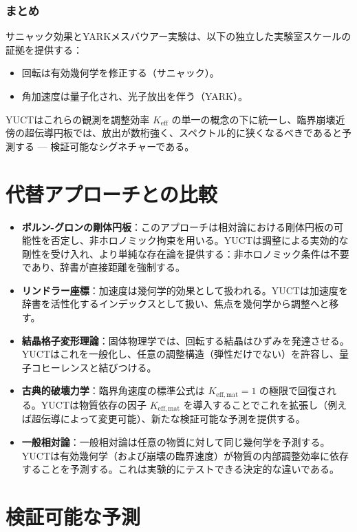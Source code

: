 \documentclass[12pt,a4paper]{article}
\begin{document}
	\subsubsection{まとめ}
	
	サニャック効果とYARKメスバウアー実験は、以下の独立した実験室スケールの証拠を提供する：
	\begin{itemize}
		\item 回転は有効幾何学を修正する（サニャック）。
		\item 角加速度は量子化され、光子放出を伴う（YARK）。
	\end{itemize}
	YUCTはこれらの観測を調整効率 \(K_{\mathrm{eff}}\) の単一の概念の下に統一し、臨界崩壊近傍の超伝導円板では、放出が数桁強く、スペクトル的に狭くなるべきであると予測する — 検証可能なシグネチャーである。
	
	\section{代替アプローチとの比較}
	\label{sec:comparison}
	
	\begin{itemize}
		\item \textbf{ボルン-グロンの剛体円板}：このアプローチは相対論における剛体円板の可能性を否定し、非ホロノミック拘束を用いる。YUCTは調整による実効的な剛性を受け入れ、より単純な存在論を提供する：非ホロノミック条件は不要であり、辞書が直接距離を強制する。
		\item \textbf{リンドラー座標}：加速度は幾何学的効果として扱われる。YUCTは加速度を辞書を活性化するインデックスとして扱い、焦点を幾何学から調整へと移す。
		\item \textbf{結晶格子変形理論}：固体物理学では、回転する結晶はひずみを発達させる。YUCTはこれを一般化し、任意の調整構造（弾性だけでない）を許容し、量子コヒーレンスと結びつける。
		\item \textbf{古典的破壊力学}：臨界角速度の標準公式は \(K_{\mathrm{eff,mat}} = 1\) の極限で回復される。YUCTは物質依存の因子 \(K_{\mathrm{eff,mat}}\) を導入することでこれを拡張し（例えば超伝導によって変更可能）、新たな検証可能な予測を提供する。
		\item \textbf{一般相対論}：一般相対論は任意の物質に対して同じ幾何学を予測する。YUCTは有効幾何学（および崩壊の臨界速度）が物質の内部調整効率に依存することを予測する。これは実験的にテストできる決定的な違いである。
	\end{itemize}
	
	\section{検証可能な予測}
	\label{sec:predict}
	
\end{document}
